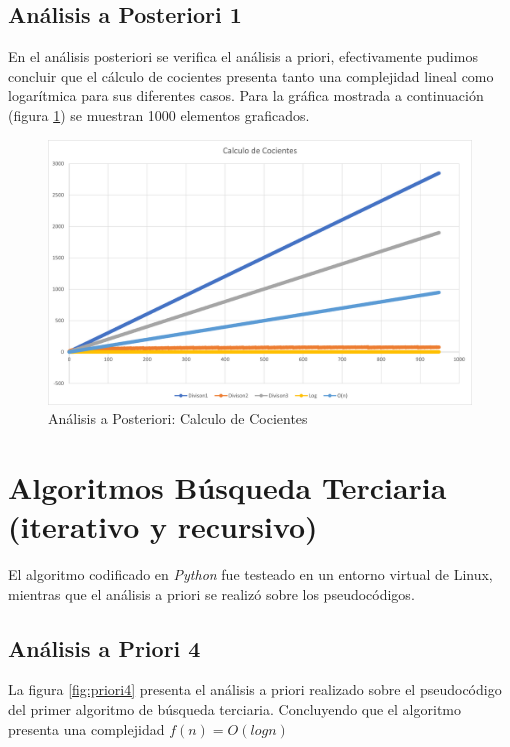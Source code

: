     
    \newpage    
    \subsection{Análisis a Posteriori 1}
        En el análisis posteriori se verifica el análisis a priori, efectivamente pudimos concluir que el cálculo de cocientes presenta tanto una complejidad lineal como logarítmica para sus diferentes casos. Para la gráfica mostrada a continuación (figura \ref{fig:posteriori1}) se muestran 1000 elementos graficados.
        \begin{figure}[htp!]
            \centering
            \includegraphics[width=1 \textwidth]{Images/A_Posteriori/posteriori1.png}  
            \caption{Análisis a Posteriori: Calculo de Cocientes}
            \label{fig:posteriori1}
        \end{figure}
    
    
    
    
    \newpage
    \section{Algoritmos Búsqueda Terciaria (iterativo y recursivo)}
        El algoritmo codificado en \textit{Python} fue testeado en un entorno virtual de Linux, mientras que el análisis a priori se realizó sobre los pseudocódigos.
    
    \subsection{Análisis a Priori 4}
        La figura \ref{fig:priori4} presenta el análisis a priori realizado sobre el pseudocódigo del  primer algoritmo de búsqueda terciaria. Concluyendo que el algoritmo presenta una complejidad \(f(n) = O(logn)\)
        
